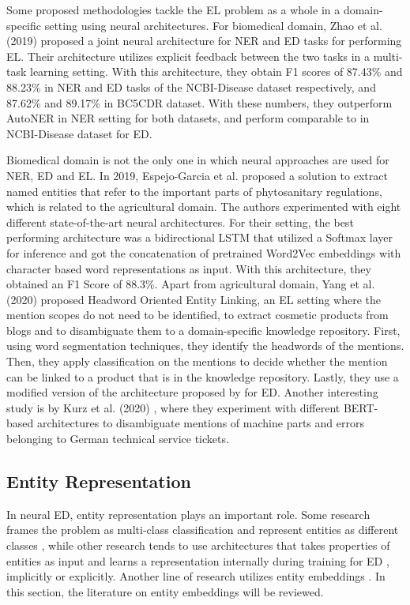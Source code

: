 \documentclass{report}
\theoremstyle{definition}
\theoremstyle{remark}
\begin{document}
Some proposed methodologies tackle the EL problem as a whole in a domain-specific setting using neural architectures. For biomedical domain, Zhao et al. (2019) \cite{MedFeedback} proposed a joint neural architecture for NER and ED tasks for performing EL. Their architecture utilizes explicit feedback between the two tasks in a multi-task learning setting. With this architecture, they obtain F1 scores of 87.43\% and 88.23\% in NER and ED tasks of the NCBI-Disease \cite{ncbi} dataset respectively, and 87.62\% and 89.17\% in BC5CDR \cite{bc5cdr} dataset. With these numbers, they outperform AutoNER \cite{NERDict2} in NER setting for both datasets, and perform comparable to \cite{MedicalTriplet} in NCBI-Disease dataset for ED.

Biomedical domain is not the only one in which neural approaches are used for NER, ED and EL. In 2019, Espejo-Garcia et al. \cite{agricultural} proposed a solution to extract named entities that refer to the important parts of phytosanitary regulations, which is related to the agricultural domain. The authors experimented with eight different state-of-the-art neural architectures. For their setting, the best performing architecture was a bidirectional LSTM \cite{bilstm} that utilized a Softmax layer for inference and got the concatenation of pretrained Word2Vec \cite{w2v} embeddings with character based word representations as input. With this architecture, they obtained an F1 Score of 88.3\%. Apart from agricultural domain, Yang et al. (2020) \cite{cosmetic} proposed Headword Oriented Entity Linking, an EL setting where the mention scopes do not need to be identified, to extract cosmetic products from blogs and to disambiguate them to a domain-specific knowledge repository. First, using word segmentation techniques, they identify the headwords of the mentions. Then, they apply classification on the mentions to decide whether the mention can be linked to a product that is in the knowledge repository. Lastly, they use a modified version of the architecture proposed by \cite{gupta} for ED.  Another interesting study is by Kurz et al. (2020) \cite{TechTickets}, where they experiment with different BERT-based \cite{BERT} architectures to disambiguate mentions of machine parts and errors belonging to German technical service tickets.

\subsection{Entity Representation}
\label{entityRep}
In neural ED, entity representation plays an important role. Some research frames the problem as multi-class classification and represent entities as different classes \cite{bertEL,MedDiffArc,MedFeedback}, while other research tends to use architectures that takes properties of entities as input and learns a representation internally during training for ED \cite{scalablezeroshot}, implicitly or explicitly. Another line of research utilizes entity embeddings \cite{REL,kolitsas,dca,MedicalTriplet}. In this section, the literature on entity embeddings will be reviewed.
\end{document}
